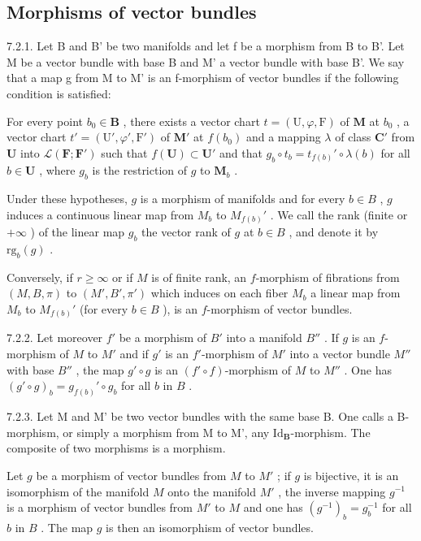 \subsection{Morphisms of vector bundles}

7.2.1. Let B and B' be two manifolds and let f be a morphism from B to B'. Let M be a vector bundle with base B and M' a vector bundle with base B'. We say that a map g from M to M' is an f-morphism of vector bundles if the following condition is satisfied:

For every point \(b_0 \in \mathbf{B}\) , there exists a vector chart \(t = (\mathrm{U}, \varphi, \mathrm{F})\) of \(\mathbf{M}\) at \(b_0\) , a vector chart \(t' = (\mathrm{U}', \varphi', \mathrm{F}')\) of \(\mathbf{M}'\) at \(f(b_0)\) and a mapping \(\lambda\) of class \(\mathbf{C}'\) from \(\mathbf{U}\) into \(\mathcal{L}(\mathbf{F}; \mathbf{F}')\) such that \(f(\mathbf{U}) \subset \mathbf{U}'\) and that \(g_b \circ t_b = t_{f(b)}' \circ \lambda(b)\) for all \(b \in \mathbf{U}\) , where \(g_b\) is the restriction of \(g\) to \(\mathbf{M}_b\) .

Under these hypotheses, \(g\) is a morphism of manifolds and for every \(b \in B\) , \(g\) induces a continuous linear map from \(M_b\) to \(M_{f(b)}'\) . We call the rank (finite or \(+\infty\) ) of the linear map \(g_b\) the vector rank of \(g\) at \(b \in B\) , and denote it by \(\text{rg}_b(g)\) .

Conversely, if \(r \geqslant \infty\) or if \(M\) is of finite rank, an \(f\)-morphism of fibrations from \((M, B, \pi)\) to \((M', B', \pi')\) which induces on each fiber \(M_b\) a linear map from \(M_b\) to \(M_{f(b)}'\) (for every \(b \in B\) ), is an \(f\)-morphism of vector bundles.

7.2.2. Let moreover \(f'\) be a morphism of \(B'\) into a manifold \(B''\) . If \(g\) is an \(f\)-morphism of \(M\) to \(M'\) and if \(g'\) is an \(f'\)-morphism of \(M'\) into a vector bundle \(M''\) with base \(B''\) , the map \(g' \circ g\) is an \((f' \circ f)\)-morphism of \(M\) to \(M''\) . One has \((g' \circ g)_b = g_{f(b)}' \circ g_b\) for all \(b\) in \(B\) .

7.2.3. Let M and M' be two vector bundles with the same base B. One calls a B-morphism, or simply a morphism from M to M', any \(\mathrm{Id}_{\mathbf{B}}\)-morphism. The composite of two morphisms is a morphism.

Let \(g\) be a morphism of vector bundles from \(M\) to \(M'\) ; if \(g\) is bijective, it is an isomorphism of the manifold \(M\) onto the manifold \(M'\) , the inverse mapping \(g^{-1}\) is a morphism of vector bundles from \(M'\) to \(M\) and one has \((g^{-1})_b = g_b^{-1}\) for all \(b\) in \(B\) . The map \(g\) is then an isomorphism of vector bundles.

